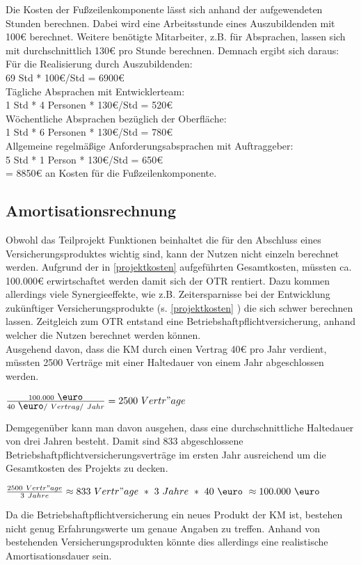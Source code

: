 Die Kosten der Fußzeilenkomponente lässt sich anhand der aufgewendeten Stunden berechnen.
Dabei wird eine Arbeitsstunde eines Auszubildenden mit 100€ berechnet. Weitere benötigte Mitarbeiter, z.B. für Absprachen, lassen sich mit durchschnittlich 130€ pro Stunde berechnen. 
Demnach ergibt sich daraus:\\
Für die Realisierung durch Auszubildenden: \\
69 Std * 100€/Std = 6900€ \\
Tägliche Absprachen mit Entwicklerteam: \\
1 Std * 4 Personen * 130€/Std = 520€\\
Wöchentliche Absprachen bezüglich der Oberfläche:  \\
1 Std * 6 Personen * 130€/Std = 780€\\
Allgemeine regelmäßige Anforderungsabsprachen mit Auftraggeber:  \\
5 Std * 1 Person *  130€/Std = 650€\\

= 8850€ an Kosten für die Fußzeilenkomponente.
\subsection{Amortisationsrechnung}
\label{amortisationsdauer}
Obwohl das Teilprojekt Funktionen beinhaltet die für den Abschluss eines Versicherungsproduktes wichtig sind, kann der Nutzen nicht einzeln berechnet werden. Aufgrund der in \ref{projektkosten}  aufgeführten Gesamtkosten, müssten ca. 100.000€ erwirtschaftet werden damit sich der \ac{OTR} rentiert. Dazu kommen allerdings viele Synergieeffekte, wie z.B. Zeitersparnisse bei der Entwicklung zukünftiger Versicherungsprodukte (s. \ref{projektkosten} ) die sich schwer berechnen lassen. Zeitgleich zum \ac{OTR} entstand eine Betriebshaftpflichtversicherung, anhand welcher die Nutzen berechnet werden können.\\
Ausgehend davon, dass die \ac{KM} durch einen Vertrag 40€ pro Jahr verdient, müssten 2500 Verträge mit einer Haltedauer von einem Jahr abgeschlossen werden.\\
\begin{center}
	$ \frac{100.000\ \mbox{\euro}}{40\ \mbox{\euro}/\ Vertrag/\ Jahr} = 2500\ Vertr"age $\\
\end{center}
Demgegenüber kann man davon ausgehen, dass eine durchschnittliche Haltedauer von drei Jahren besteht. Damit sind 833 abgeschlossene Betriebshaftpflichtversicherungsverträge im ersten Jahr ausreichend um die Gesamtkosten des Projekts zu decken.
\begin{center}
	$ \frac{2500\ Vertr"age}{3\ Jahre} \approx833\ Vertr"age\ *\ 3\ Jahre\ *\ 40\ \mbox{\euro}\ \approx100.000\ \mbox{\euro} $\\
\end{center}
 Da die Betriebshaftpflichtversicherung ein neues Produkt der \ac{KM} ist, bestehen nicht genug Erfahrungswerte um genaue Angaben zu treffen. Anhand von bestehenden Versicherungsprodukten könnte dies allerdings eine realistische Amortisationsdauer sein.

